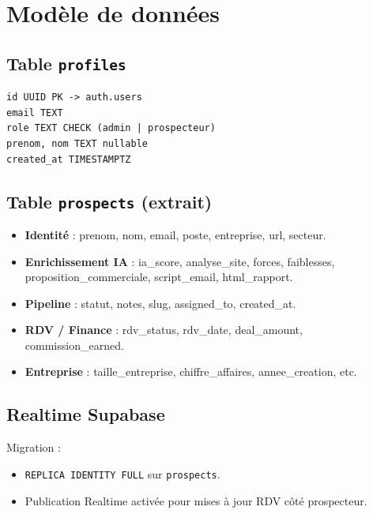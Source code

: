 \documentclass[11pt,a4paper]{report}
\begin{document}
\chapter{Modèle de données}

\section{Table \texttt{profiles}}

\begin{lstlisting}
id UUID PK -> auth.users
email TEXT
role TEXT CHECK (admin | prospecteur)
prenom, nom TEXT nullable
created_at TIMESTAMPTZ
\end{lstlisting}

\section{Table \texttt{prospects} (extrait)}

\begin{itemize}[noitemsep]
  \item \textbf{Identité} : prenom, nom, email, poste, entreprise, url, secteur.
  \item \textbf{Enrichissement IA} : ia\_score, analyse\_site, forces, faiblesses, proposition\_commerciale, script\_email, html\_rapport.
  \item \textbf{Pipeline} : statut, notes, slug, assigned\_to, created\_at.
  \item \textbf{RDV / Finance} : rdv\_status, rdv\_date, deal\_amount, commission\_earned.
  \item \textbf{Entreprise} : taille\_entreprise, chiffre\_affaires, annee\_creation, etc.
\end{itemize}

\section{Realtime Supabase}

Migration  :
\begin{itemize}[noitemsep]
  \item \texttt{REPLICA IDENTITY FULL} sur \texttt{prospects}.
  \item Publication Realtime activée pour mises à jour RDV côté prospecteur.
\end{itemize}
\end{document}
